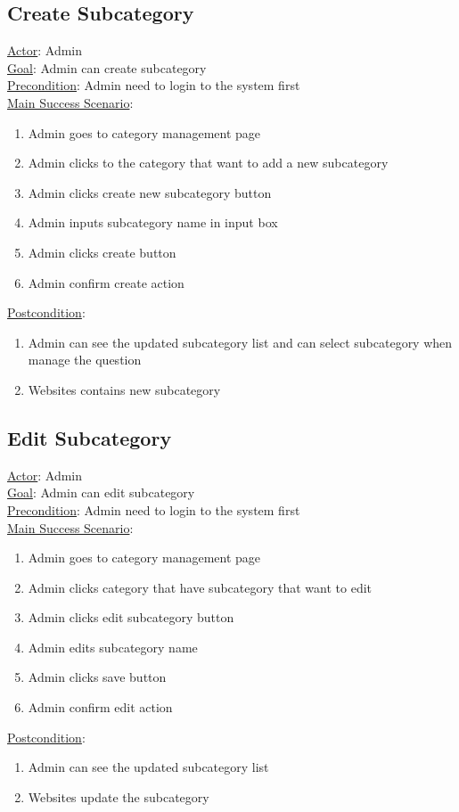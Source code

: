 \documentclass[12pt,oneside,openright,a4paper]{cpe-english-project}
\begin{document}
\subsection{Create Subcategory}
\underline{Actor}: Admin\\
\underline{Goal}: Admin can create subcategory\\
\underline{Precondition}: Admin need to login to the system first\\
\underline{Main Success Scenario}:
\begin{enumerate}[label={\arabic*.}]
	\item Admin goes to category management page
	\item Admin clicks to the category that want to add a new subcategory
	\item Admin clicks create new subcategory button
	\item Admin inputs subcategory name in input box
	\item Admin clicks create button
	\item Admin confirm create action
\end{enumerate}
\underline{Postcondition}: 
\begin{enumerate}[label={\arabic*.}]
	\item Admin can see the updated subcategory list and can select subcategory when manage the question
	\item Websites contains new subcategory
\end{enumerate}

\subsection{Edit Subcategory}
\underline{Actor}: Admin\\
\underline{Goal}: Admin can edit subcategory\\
\underline{Precondition}: Admin need to login to the system first\\
\underline{Main Success Scenario}:
\begin{enumerate}[label={\arabic*.}]
	\item Admin goes to category management page
	\item Admin clicks category that have subcategory that want to edit
	\item Admin clicks edit subcategory button
	\item Admin edits subcategory name
	\item Admin clicks save button
	\item Admin confirm edit action
\end{enumerate}
\underline{Postcondition}: 
\begin{enumerate}[label={\arabic*.}]
	\item Admin can see the updated subcategory list
	\item Websites update the subcategory
\end{enumerate}
\end{document}
